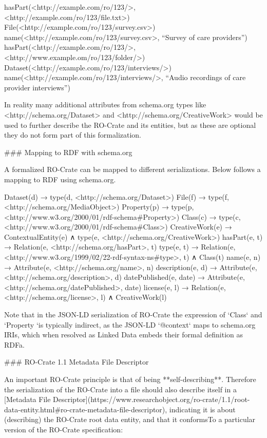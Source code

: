     hasPart(<http://example.com/ro/123/>, <http://example.com/ro/123/file.txt>)
    File(<http://example.com/ro/123/survey.csv>)
    name(<http://example.com/ro/123/survey.csv>, “Survey of care providers”)
    hasPart(<http://example.com/ro/123/>, <http://www.example.om/ro/123/folder/>)
    Dataset(<http://example.com/ro/123/interviews/>)
    name(<http://example.com/ro/123/interviews/>, 
        “Audio recordings of care provider interviews”)

\begin{markdown}
In reality many additional attributes from schema.org types like <http://schema.org/Dataset> and <http://schema.org/CreativeWork> would be used to further describe the RO-Crate and its entities, but as these are optional they do not form part of this formalization.
\end{markdown}

### Mapping to RDF with schema.org

A formalized RO-Crate can be mapped to different serializations. Below follows a mapping to RDF using schema.org.

    Dataset(d) →  type(d, <http://schema.org/Dataset>)
    File(f) →  type(f, <http://schema.org/MediaObject>)
    Property(p) →  type(p, <http://www.w3.org/2000/01/rdf-schema#Property>)
    Class(c) →  type(c, <http://www.w3.org/2000/01/rdf-schema#Class>)
    CreativeWork(e) →  ContextualEntity(e) ∧ type(e, <http://schema.org/CreativeWork>)
    hasPart(e, t) →  Relation(e, <http://schema.org/hasPart>, t)
    type(e, t) →  Relation(e, <http://www.w3.org/1999/02/22-rdf-syntax-ns#type>, t) ∧ Class(t)
    name(e, n) →  Attribute(e, <http://schema.org/name>, n)
    description(e, d) →  Attribute(e, <http://schema.org/description>, d)
    datePublished(e, date) →  Attribute(e, <http://schema.org/datePublished>, date)
    license(e, l) →  Relation(e, <http://schema.org/license>, l) ∧ CreativeWork(l)

Note that in the JSON-LD serialization of RO-Crate the expression of `Class` and `Property `is typically indirect, as the JSON-LD `@context` maps to schema.org IRIs, which when resolved as Linked Data embeds their formal definition as RDFa. 


### RO-Crate 1.1 Metadata File Descriptor

An important RO-Crate principle is that of being **self-describing**. Therefore the serialization of the RO-Crate into a file should also describe itself in a [Metadata File Descriptor](https://www.researchobject.org/ro-crate/1.1/root-data-entity.html#ro-crate-metadata-file-descriptor), indicating it is about (describing) the RO-Crate root data entity, and that it conformsTo a particular version of the RO-Crate specification:

